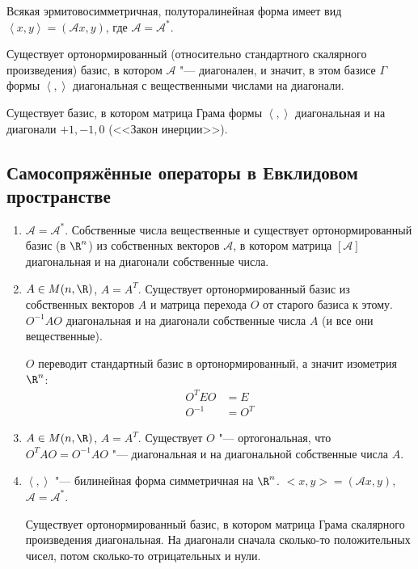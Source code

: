 Всякая эрмитовосимметричная, полуторалинейная форма имеет вид $\left<x, y\right> = (\mathcal Ax, y)$, где $\mathcal A = \mathcal{A}^*$.

\begin{conseq}
	Существует ортонормированный (относительно стандартного скалярного произведения) базис,
	в котором $\mathcal A$ "--- диагонален,
	и значит, в этом базисе $\Gamma$ формы $\left<,\right>$ диагональная с вещественными числами на диагонали.
\end{conseq}
\begin{conseq}
	Существует базис, в котором матрица Грама формы $\left<,\right>$ диагональная и на диагонали $+1, -1, 0$ (<<Закон инерции>>).
\end{conseq}

\subsection{Самосопряжённые операторы в Евклидовом пространстве}

\begin{enumerate}
\item
	$\mathcal A = \mathcal{A}^*$.
	Собственные числа вещественные и существует ортонормированный базис (в $\R^n$) из собственных векторов $\mathcal A$,
	в котором матрица $[\mathcal A]$ диагональная и на диагонали собственные числа.

\item
	$A \in M(n, \R)$, $A = A^T$.
	Существует ортонормированный базис из собственных векторов $A$ и матрица перехода $O$ от старого базиса к этому.
	$O^{-1}AO$ диагональная и на диагонали собственные числа $A$ (и все они вещественные).

	$O$ переводит стандартный базис в ортонормированный, а значит изометрия $\R^n$:
	\begin{align*}
		O^T E O &= E \\
		O^{-1}  &= O^T
	\end{align*}

\item
	$A \in M(n,\R)$, $A = A^T$.
	Существует $O$ "--- ортогональная, что $O^TAO = O^{-1}AO$ "--- диагональная и на диагональной собственные числа $A$.

\item
	$\left<,\right>$ "--- билинейная форма симметричная на $\R^n$.
	$<x, y> = (\mathcal Ax, y)$, $\mathcal A = \mathcal{A}^*$.

	Существует ортонормированный базис, в котором матрица Грама скалярного произведения диагональная.
	На диагонали сначала сколько-то положительных чисел, потом сколько-то отрицательных и нули.
\end{enumerate}


